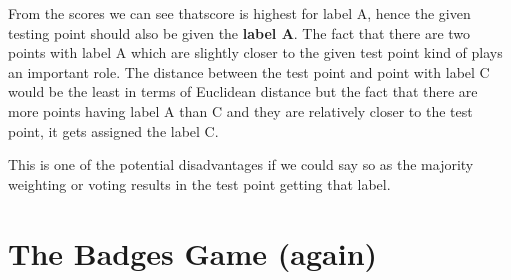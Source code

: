 \documentclass[11pt]{article}
\begin{document}
\begin{enumerate}
From the scores we can see thatscore is highest for label A, hence the given testing point should also be given the \textbf{label A}.
The fact that there are two points with label A which are slightly closer to the given test point kind of plays an important role. The distance between the test point and point with label C would be the least in terms of Euclidean distance but the fact that there are more points having label A than C and they are relatively closer to the test point, it gets assigned the label C.

This is one of the potential disadvantages if we could say so as the majority weighting or voting results in the test point getting that label.
	
\end{enumerate}		


\section{The Badges Game (again)}
\end{document}
